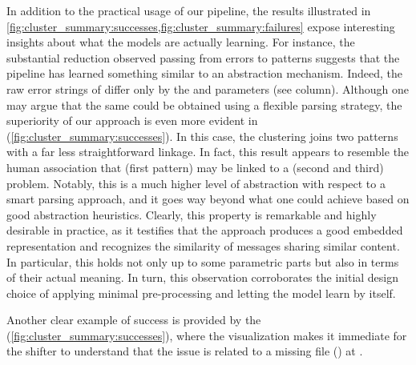 In addition to the practical usage of our pipeline, the results illustrated in \cref{fig:cluster_summary:successes,fig:cluster_summary:failures} expose interesting insights about what the models are actually learning.
For instance, the substantial reduction observed passing from errors to patterns suggests that the pipeline has learned something similar to an abstraction mechanism.
Indeed, the raw error strings of  differ only by the  and  parameters (see  column).
Although one may argue that the same could be obtained using a flexible parsing strategy, the superiority of our approach is even more evident in  (\cref{fig:cluster_summary:successes}). 
In this case, the clustering joins two patterns with a far less straightforward linkage.
In fact, this result appears to resemble the human association that  (first pattern) may be linked to a  (second and third) problem.
Notably, this is a much higher level of abstraction with respect to a smart parsing approach, and it goes way beyond what one could achieve based on good abstraction heuristics.
Clearly, this property is remarkable and highly desirable in practice, as it testifies that the approach produces a good embedded representation and recognizes the similarity of messages sharing similar content.
In particular, this holds not only up to some parametric parts but also in terms of their actual meaning.
In turn, this observation corroborates the initial design choice of applying minimal pre-processing and letting the model learn by itself.

Another clear example of success is provided by the  (\cref{fig:cluster_summary:successes}), where the visualization makes it immediate for the shifter to understand that the issue is related to a missing file () at .

